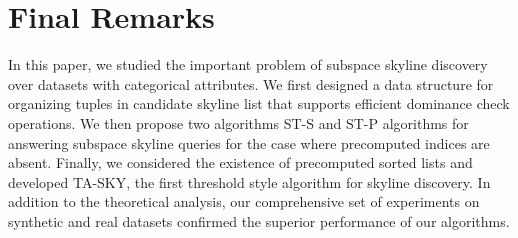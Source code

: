 \section{Final Remarks}\label{sec:conclusion}
In this paper, we studied the important problem of subspace skyline discovery over datasets with categorical attributes.
We first designed a data structure for organizing tuples in candidate skyline list that supports efficient dominance check operations. We then propose two algorithms ST-S and ST-P algorithms for answering subspace skyline queries for the case where precomputed indices are absent. Finally, we considered the existence of precomputed sorted lists and developed TA-SKY,
the first threshold style algorithm for skyline discovery. 
In addition to the theoretical analysis, our comprehensive set of experiments on synthetic and real datasets confirmed the superior performance of our algorithms.